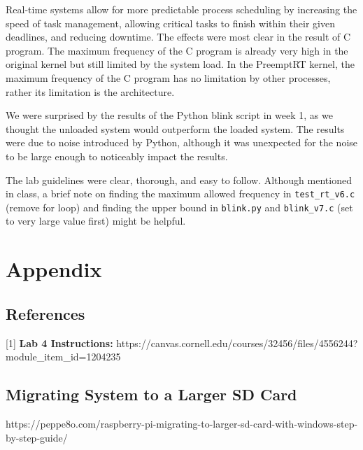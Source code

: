 \documentclass[a4paper,10pt]{article}
\newcommand{\code}[1]{\colorbox{light-gray}{\texttt{#1}}}
\begin{document}
Real-time systems allow for more predictable process scheduling by increasing the speed of task management, allowing critical tasks to finish within their given deadlines, and reducing downtime. The effects were most clear in the result of C program. The maximum frequency of the C program is already very high in the original kernel but still limited by the system load. In the PreemptRT kernel, the maximum frequency of the C program has no limitation by other processes, rather its limitation is the architecture.

We were surprised by the results of the Python blink script in week 1, as we thought the unloaded system would outperform the loaded system. The results were due to noise introduced by Python, although it was unexpected for the noise to be large enough to noticeably impact the results.

The lab guidelines were clear, thorough, and easy to follow. Although mentioned in class, a brief note on finding the maximum allowed frequency in \code{test\_rt\_v6.c} (remove for loop) and finding the upper bound in \code{blink.py} and \code{blink_v7.c} (set to very large value first) might be helpful. 


\newpage
\section{Appendix}

\subsection{References}


[1] \textbf{Lab 4 Instructions:} https://canvas.cornell.edu/courses/32456/files/4556244?module\_item\_id=1204235

\subsection{Migrating System to a Larger SD Card}

https://peppe8o.com/raspberry-pi-migrating-to-larger-sd-card-with-windows-step-by-step-guide/
\end{document}
